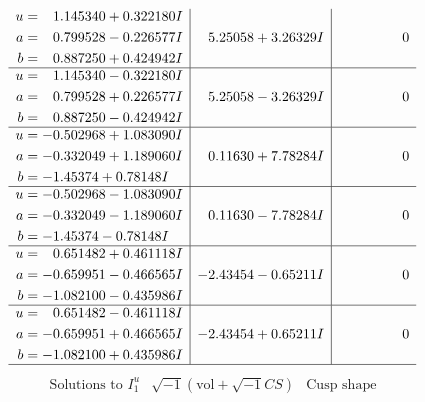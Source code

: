 \documentclass[1p]{elsarticle_modified}
\theoremstyle{definition}
\newcommand{\I}{\sqrt{-1}}
\begin{document}
$$\begin{array}{c|c|c}
\begin{aligned}
u &= \phantom{-}1.145340 + 0.322180 I \\
a &= \phantom{-}0.799528 - 0.226577 I \\
b &= \phantom{-}0.887250 + 0.424942 I\end{aligned}
 & \phantom{-}5.25058 + 3.26329 I & \phantom{-0.000000 } 0 \\ \hline\begin{aligned}
u &= \phantom{-}1.145340 - 0.322180 I \\
a &= \phantom{-}0.799528 + 0.226577 I \\
b &= \phantom{-}0.887250 - 0.424942 I\end{aligned}
 & \phantom{-}5.25058 - 3.26329 I & \phantom{-0.000000 } 0 \\ \hline\begin{aligned}
u &= -0.502968 + 1.083090 I \\
a &= -0.332049 + 1.189060 I \\
b &= -1.45374 + 0.78148 I\end{aligned}
 & \phantom{-}0.11630 + 7.78284 I & \phantom{-0.000000 } 0 \\ \hline\begin{aligned}
u &= -0.502968 - 1.083090 I \\
a &= -0.332049 - 1.189060 I \\
b &= -1.45374 - 0.78148 I\end{aligned}
 & \phantom{-}0.11630 - 7.78284 I & \phantom{-0.000000 } 0 \\ \hline\begin{aligned}
u &= \phantom{-}0.651482 + 0.461118 I \\
a &= -0.659951 - 0.466565 I \\
b &= -1.082100 - 0.435986 I\end{aligned}
 & -2.43454 - 0.65211 I & \phantom{-0.000000 } 0 \\ \hline\begin{aligned}
u &= \phantom{-}0.651482 - 0.461118 I \\
a &= -0.659951 + 0.466565 I \\
b &= -1.082100 + 0.435986 I\end{aligned}
 & -2.43454 + 0.65211 I & \phantom{-0.000000 } 0\\
 \hline 
 \end{array}$$\newpage$$\begin{array}{c|c|c}  
\text{Solutions to }I^u_{1}& \I (\text{vol} + \sqrt{-1}CS) & \text{Cusp shape}\\
 \hline 
\begin{aligned}

\end{aligned}
\end{array}$$
\end{document}
